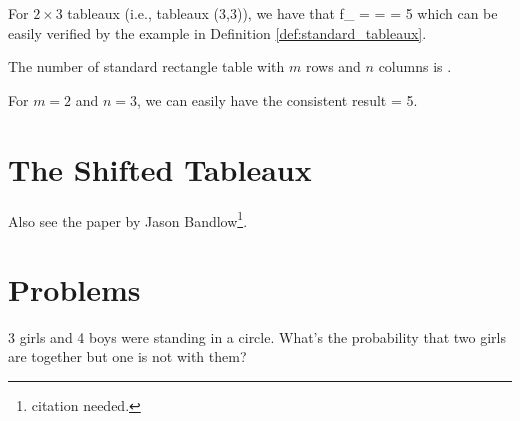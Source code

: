 %
%
%
%
%
%
%
%
%
%


\begin{example}
For $2\times 3$ tableaux (i.e., tableaux (3,3)), we have that
\be
f_{\lm} =  =  = 5
\ee
which can be easily verified by the example in Definition \ref{def:standard_tableaux}.
\end{example}

\begin{corollary}
The number of standard rectangle table with $m$ rows and $n$ columns is
\be
{}.
\ee
\end{corollary}

\begin{remark}
For $m=2$ and $n=3$, we can easily have the consistent result
\be
{} = 5.
\ee
\end{remark}


\section{The Shifted Tableaux}

Also see the paper by Jason Bandlow\footnote{citation needed.}.

\section{Problems}

\begin{problem}
3 girls and 4 boys were standing in a circle. What's the probability that two girls are together but one is not with them?
\end{problem}

